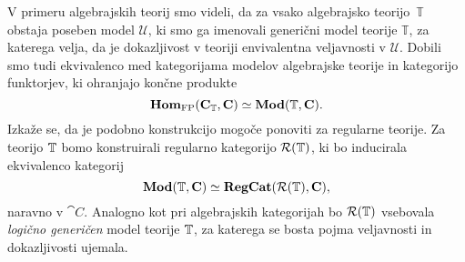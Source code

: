 \documentclass[../kategoricna_logika.tex]{subfiles}
\begin{document}
V primeru algebrajskih teorij smo videli, da za vsako algebrajsko
teorijo~$\mathbb{T}$ obstaja poseben model $\mathcal{U}$, ki smo ga
imenovali generični model teorije $\mathbb{T}$, za katerega velja, da
je dokazljivost v teoriji envivalentna veljavnosti v $\mathcal{U}$.
Dobili smo tudi ekvivalenco med kategorijama modelov algebrajske
teorije in kategorijo funktorjev, ki ohranjajo končne produkte
$$\mathbf{Hom}_{\mathrm{FP}}({\operatorname{\mathbf{C}}}_{\mathbb{T}}, {\operatorname{\mathbf{C}}}) \simeq \mathbf{Mod}(\mathbb{T}, {\operatorname{\mathbf{C}}}).$$
Izkaže se, da je podobno konstrukcijo mogoče ponoviti za regularne
teorije.  Za teorijo $\mathbb{T}$ bomo konstruirali regularno kategorijo
$\mathcal{R}(\mathbb{T})$, ki bo inducirala ekvivalenco kategorij
$$\mathbf{Mod}(\mathbb{T}, {\operatorname{\mathbf{C}}}) \simeq {\operatorname{\mathbf{RegCat}}}(\mathcal{R}(\mathbb{T}), {\operatorname{\mathbf{C}}}),$$
naravno v $\cat{C}$. Analogno kot pri algebrajskih kategorijah bo
$\mathcal{R}(\mathbb{T})$ vsebovala \emph{logično generičen} model teorije $\mathbb{T}$, za
katerega se bosta pojma veljavnosti in dokazljivosti ujemala.
\end{document}
